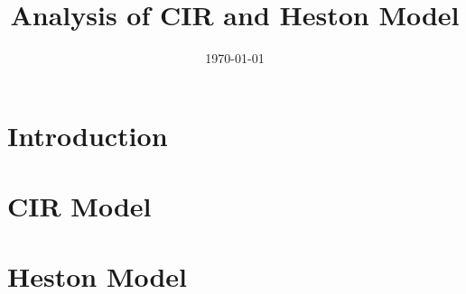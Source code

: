 \documentclass[
	xcolor={svgnames},
	hyperref={pagebackref,bookmarks},
	aspectratio=43,
]{beamer}
\title[]{Analysis of CIR and Heston Model}
\title{\presentationtitle}
\author[]{\presenter}
\institute[IITH]{
	\university\\
}
\date{\today}
\begin{document}
\newcommand{\brak}[1]{\ensuremath{\left( #1 \right)}}
\newcommand{\sbrak}[1]{\ensuremath{\left[ #1 \right]}}
\newcommand{\bigbrak}[1]{\ensuremath{\big{(} #1 \big{)}}}
\newcommand{\Bigbrak}[1]{\ensuremath{\Big{(} #1 \Big{)}}}
\newcommand{\Exp}[1]{\ensuremath{\mathbb{E} \left[ #1 \right]}}
\newcommand{\Var}[1]{\ensuremath{\text{Var} \left[ #1 \right]}}
\providecommand{\nCr}[2]{\ensuremath{\,^{#1}C_{#2}}}
\providecommand{\nPr}[2]{\ensuremath{\,^{#1}P_{#2}}}

\begin{frame}
	\titlepage
\end{frame}

\begin{frame}
	\tableofcontents
\end{frame}

\section{Introduction}


\section{CIR Model}


\section{Heston Model}

\end{document}
